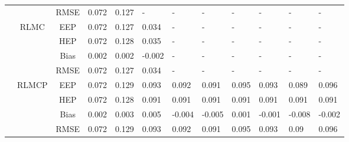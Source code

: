 \documentclass[10pt, a4paper]{article}
\begin{document}
\begin{longtable}[t]{lcclllllllll}
                                                                                                                                &                       & RMSE  & 0.072     & 0.127	    & -	        & -	        & -	        & -	        & -	        & -	        & -         \\ \cline{2-12} 
                                                                                                                                & \multirow{4}{*}{RLMC} & EEP   & 0.072     & 0.127	    & 0.034	    & -	        & -	        & -	        & -	        & -	        & -         \\ 
                                                                                                                                &                       & HEP   & 0.072     & 0.128	    & 0.035	    & -	        & -	        & -	        & -	        & -	        & -         \\ 
                                                                                                                                &                       & Bias  & 0.002     & 0.002	    & -0.002	& -	        & -	        & -	        & -	        & -	        & -         \\ 
                                                                                                                                &                       & RMSE  & 0.072     & 0.127	    & 0.034	    & -	        & -	        & -	        & -	        & -	        & -         \\ \cline{2-12} 
                                                                                                                                & \multirow{4}{*}{RLMCP}& EEP   & 0.072     & 0.129	    & 0.093	    & 0.092	    & 0.091	    & 0.095 	& 0.093     & 0.089     & 0.096     \\ 
                                                                                                                                &                       & HEP   & 0.072     & 0.128	    & 0.091	    & 0.091	    & 0.091	    & 0.091 	& 0.091     & 0.091     & 0.091     \\
                                                                                                                                &                       & Bias  & 0.002     & 0.003	    & 0.005	    & -0.004	& -0.005	& 0.001 	& -0.001    & -0.008    & -0.002    \\
                                                                                                                                &                       & RMSE  & 0.072     & 0.129	    & 0.093	    & 0.092	    & 0.091	    & 0.095 	& 0.093     & 0.09      & 0.096     \\ \hline

\end{longtable}
\end{document}
